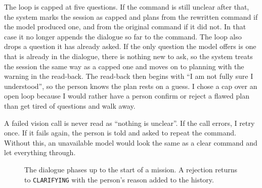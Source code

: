 The loop is capped at five questions. If the command is still unclear after that,
the system marks the session as capped and plans from the rewritten command if
the model produced one, and from the original command if it did not. In that case
it no longer appends the dialogue so far to the command. %
The loop also drops a question it has already asked. If the only question the
model offers is one that is already in the dialogue, there is nothing new to ask,
so the system treats the session the same way as a capped one and moves on to
planning with the warning in the read-back. The read-back
then begins with ``I am not fully sure I understood'', so the person knows the
plan rests on a guess. I chose a cap over an open loop because I would rather have
a person confirm or reject a flawed plan than get tired of questions and walk
away.

A failed vision call is never read as ``nothing is unclear''. If the call errors,
I retry once. If it fails again, the person is told and asked to repeat the
command. Without this, an unavailable model would look the same as a clear
command and let everything through.

\begin{figure}[htbp]
  \centering
  \caption{The dialogue phases up to the start of a mission. A rejection returns to \texttt{CLARIFYING} with the person's reason added to the history.}
  \label{fig:states}
\end{figure}

